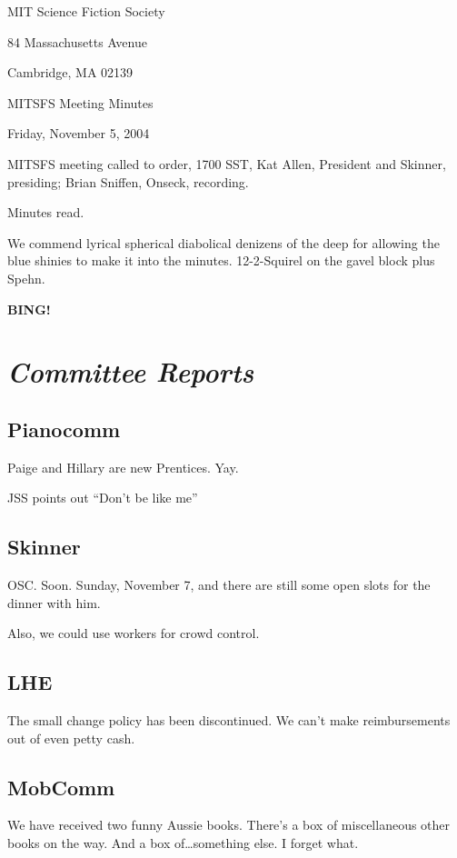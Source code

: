 \documentclass[10pt]{article}
\newcommand{\bing}{{\bf BING!} }
\newcommand{\goto}[1]{\bing \vskip 12pt \section*{{\em{#1}}}}
\newcommand{\ps}{ plus Spehn\xspace}
\begin{document}
\begin{center}

MIT Science Fiction Society

84 Massachusetts Avenue

Cambridge, MA 02139

\vspace{12pt}

MITSFS Meeting Minutes

Friday, November 5, 2004

\end{center}

\vspace{18pt}

\setlength{\parskip}{6pt}

\noindent
MITSFS meeting called to order, 1700 SST, Kat Allen, President and
Skinner, presiding; Brian Sniffen,  Onseck, recording.

Minutes read.

We commend lyrical spherical diabolical denizens of the deep for allowing the
blue shinies to make it into the minutes.  12-2-Squirel on the gavel block\ps.

\goto{Committee Reports}
\subsection*{Pianocomm}
Paige and Hillary are new Prentices.  Yay.

JSS points out ``Don't be like me''

\subsection*{Skinner}

OSC.  Soon.  Sunday, November 7, and there are still some open slots
for the dinner with him.

Also, we could use workers for crowd control.

\subsection*{LHE}
The small change policy has been discontinued.  We can't make
reimbursements out of even petty cash.

\subsection*{MobComm}
We have received two funny Aussie books.  There's a box of
miscellaneous other books on the way.  And a box of\dots something
else.  I forget what.
\end{document}
